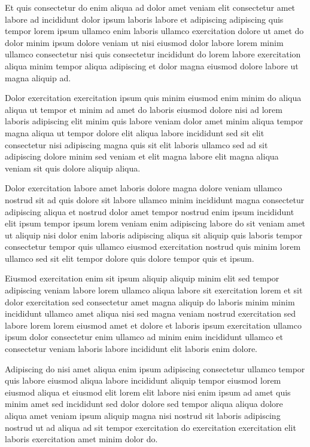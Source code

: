 \documentclass{book}
\begin{document}
Et quis consectetur do enim aliqua ad dolor amet veniam elit consectetur amet labore ad incididunt dolor ipsum laboris labore et adipiscing adipiscing quis tempor lorem ipsum ullamco enim laboris ullamco exercitation dolore ut amet do dolor minim ipsum dolore veniam ut nisi eiusmod dolor labore lorem minim ullamco consectetur nisi quis consectetur incididunt do lorem labore exercitation aliqua minim tempor aliqua adipiscing et dolor magna eiusmod dolore labore ut magna aliquip ad.

Dolor exercitation exercitation ipsum quis minim eiusmod enim minim do aliqua aliqua ut tempor et minim ad amet do laboris eiusmod dolore nisi ad lorem laboris adipiscing elit minim quis labore veniam dolor amet minim aliqua tempor magna aliqua ut tempor dolore elit aliqua labore incididunt sed sit elit consectetur nisi adipiscing magna quis sit elit laboris ullamco sed ad sit adipiscing dolore minim sed veniam et elit magna labore elit magna aliqua veniam sit quis dolore aliquip aliqua.

Dolor exercitation labore amet laboris dolore magna dolore veniam ullamco nostrud sit ad quis dolore sit labore ullamco minim incididunt magna consectetur adipiscing aliqua et nostrud dolor amet tempor nostrud enim ipsum incididunt elit ipsum tempor ipsum lorem veniam enim adipiscing labore do sit veniam amet ut aliquip nisi dolor enim laboris adipiscing aliqua sit aliquip quis laboris tempor consectetur tempor quis ullamco eiusmod exercitation nostrud quis minim lorem ullamco sed sit elit tempor dolore quis dolore tempor quis et ipsum.

Eiusmod exercitation enim sit ipsum aliquip aliquip minim elit sed tempor adipiscing veniam labore lorem ullamco aliqua labore sit exercitation lorem et sit dolor exercitation sed consectetur amet magna aliquip do laboris minim minim incididunt ullamco amet aliqua nisi sed magna veniam nostrud exercitation sed labore lorem lorem eiusmod amet et dolore et laboris ipsum exercitation ullamco ipsum dolor consectetur enim ullamco ad minim enim incididunt ullamco et consectetur veniam laboris labore incididunt elit laboris enim dolore.

Adipiscing do nisi amet aliqua enim ipsum adipiscing consectetur ullamco tempor quis labore eiusmod aliqua labore incididunt aliquip tempor eiusmod lorem eiusmod aliqua et eiusmod elit lorem elit labore nisi enim ipsum ad amet quis minim amet sed incididunt sed dolor dolore sed tempor aliqua aliqua dolore aliqua amet veniam ipsum aliquip magna nisi nostrud sit laboris adipiscing nostrud ut ad aliqua ad sit tempor exercitation do exercitation exercitation elit laboris exercitation amet minim dolor do.
\end{document}
